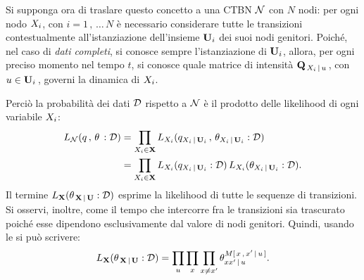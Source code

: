 Si supponga ora di traslare questo concetto a una \acl{CTBN} $\mathcal{N}$ con $N$ nodi: per ogni nodo $\mathnormal{X_i}$, con $i=1\,,\,\dotsc\,N$ è necessario considerare tutte le transizioni contestualmente all'istanziazione dell'insieme $\mathbf{U}_i$ dei suoi nodi genitori. Poiché, nel caso di \emph{dati completi}, si conosce sempre l'istanziazione di $\mathbf{U}_i$, allora, per ogni preciso momento nel tempo $t$, si conosce quale matrice di intensità $\mathbf{Q}_{\,\mathnormal{X_i}\,\arrowvert\,\mathnormal{u}}\,$, con $u\in\mathbf{U}_i\,$, governi la dinamica di $\mathnormal{X_i}$.

Perciò la probabilità dei dati $\mathcal{D}$ rispetto a $\mathcal{N}$ è il prodotto delle likelihood di ogni variabile $\mathnormal{X_i}$:
\begin{equation}
\begin{split}
L_{\mathcal{N}}(q\,,\,\theta\,:\mathcal{D})&=\prod_{\mathnormal{X_i}\in\mathbf{X}}L_{\mathnormal{X_i}}(q_{\mathnormal{X_i}\,\arrowvert\,\mathbf{U}_i}\,,\,\theta_{\mathnormal{X_i}\,\arrowvert\,\mathbf{U}_i}:\mathcal{D}) \\
&=\prod_{\mathnormal{X_i}\in\mathbf{X}}L_{\mathnormal{X_i}}(q_{\mathnormal{X_i}\,\arrowvert\,\mathbf{U}_i}:\mathcal{D})\,L_{\mathnormal{X_i}}(\theta_{\mathnormal{X_i}\,\arrowvert\,\mathbf{U}_i}:\mathcal{D})\text{.}
\end{split}
\end{equation}
Il termine $L_{\mathbf{X}}(\theta_{\,\mathbf{X}\,\arrowvert\,\mathbf{U}}:\mathcal{D})$ esprime la likelihood di tutte le sequenze di transizioni. Si osservi, inoltre, come il tempo che intercorre fra le transizioni sia trascurato poiché esse dipendono esclusivamente dal valore di nodi genitori. Quindi, usando le \emph{\stats{}} si può scrivere:
\[
L_{\set{X}}(\theta_{\,\set{X}\,\arrowvert\,\set{U}}:\conceptsym{D})=\prod_{u} \prod_{x} \prod_{x\neq x^{\prime}}\theta_{xx^{\prime}\,\arrowvert\,u}^{\mstat[x]{x^{\prime}\,\arrowvert\,u}}\text{.}
\]

